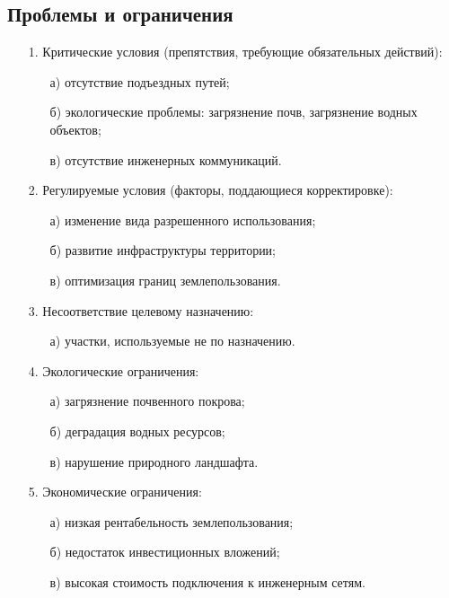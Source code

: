 \subsection{Проблемы и ограничения}
\label{subsec:problem}

\begin{enumerate}
    \item[1.] Критические условия (препятствия, требующие обязательных действий):
    \begin{enumerate}
        \item[а)] отсутствие подъездных путей;
        \item[б)] экологические проблемы: загрязнение почв, загрязнение водных объектов;
        \item[в)] отсутствие инженерных коммуникаций.
    \end{enumerate}
    \item[2.] Регулируемые условия (факторы, поддающиеся корректировке):
    \begin{enumerate}
        \item[а)] изменение вида разрешенного использования;
        \item[б)] развитие инфраструктуры территории;
        \item[в)] оптимизация границ землепользования.
    \end{enumerate}
    \item[3.] Несоответствие целевому назначению:
    \begin{enumerate}
        \item[а)] участки, используемые не по назначению.
    \end{enumerate}
    \item[4.] Экологические ограничения:
    \begin{enumerate}
        \item[а)] загрязнение почвенного покрова;
        \item[б)] деградация водных ресурсов;
        \item[в)] нарушение природного ландшафта.
    \end{enumerate}
    \item[5.] Экономические ограничения:
    \begin{enumerate}
        \item[а)] низкая рентабельность землепользования;
        \item[б)] недостаток инвестиционных вложений;
        \item[в)] высокая стоимость подключения к инженерным сетям.

\end{enumerate}
\end{enumerate}
